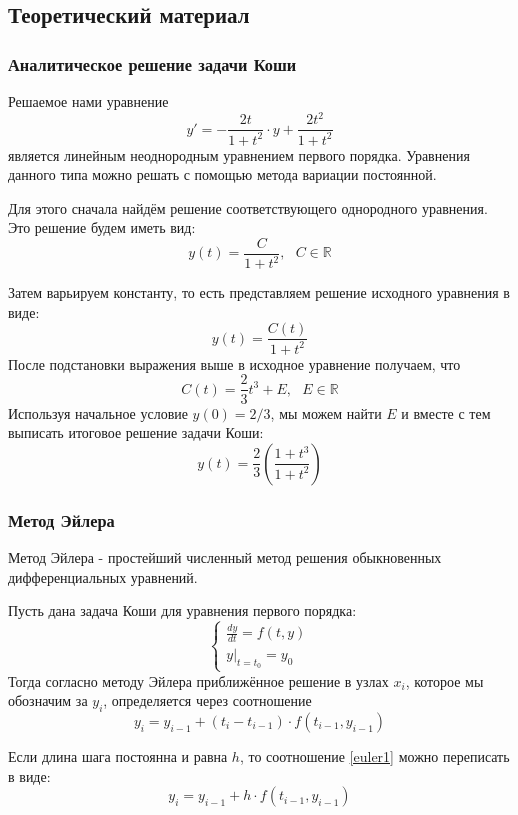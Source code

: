\documentclass[12pt]{article}%
\begin{document}
\subsection{Теоретический материал}
\subsubsection{Аналитическое решение задачи Коши}
Решаемое нами уравнение
\begin{equation}
y' = -\frac{2t}{1 + t^2}\cdot y + \frac{2 t^2}{1 + t^2}
\end{equation}
является линейным неоднородным уравнением первого порядка. Уравнения данного типа можно решать с помощью метода вариации постоянной.

Для этого сначала найдём решение соответствующего однородного уравнения. Это решение будем иметь вид:
\begin{equation}
    y(t) = \frac{C}{1 + t^2},\ \ \ C \in \mathbb{R}
\end{equation}

Затем варьируем константу, то есть представляем решение исходного уравнения в виде:
$$
y(t) = \frac{C(t)}{1 + t^2}
$$
После подстановки выражения выше в исходное уравнение получаем, что
$$
C(t) = \frac{2}{3}t^3 + E, \ \ \ E \in \mathbb{R}
$$
Используя начальное условие $y(0) = 2/3$, мы можем найти $E$ и вместе с тем выписать итоговое решение задачи Коши:
\begin{equation}
    y(t) = \frac{2}{3} \left( \frac{1 + t^3}{1 + t^2} \right)
\end{equation}

\subsubsection{Метод Эйлера}
Метод Эйлера - простейший численный метод решения обыкновенных дифференциальных уравнений.

Пусть дана задача Коши для уравнения первого порядка:
$$
\begin{cases}
    \frac{dy}{dt} = f(t, y) \\
    y |_{t = t_0} = y_0
\end{cases}
$$
Тогда согласно методу Эйлера приближённое решение в узлах $x_i$, которое мы обозначим за $y_i$, определяется через соотношение
\begin{equation}\label{euler1}
    y_i = y_{i-1} + (t_{i} - t_{i-1}) \cdot f(t_{i - 1}, y_{i - 1})
\end{equation}

Если длина шага постоянна и равна $h$, то соотношение \ref{euler1} можно переписать в виде:
\begin{equation}
    y_i = y_{i-1} + h \cdot f(t_{i-1}, y_{i - 1})
\end{equation}
\end{document}
